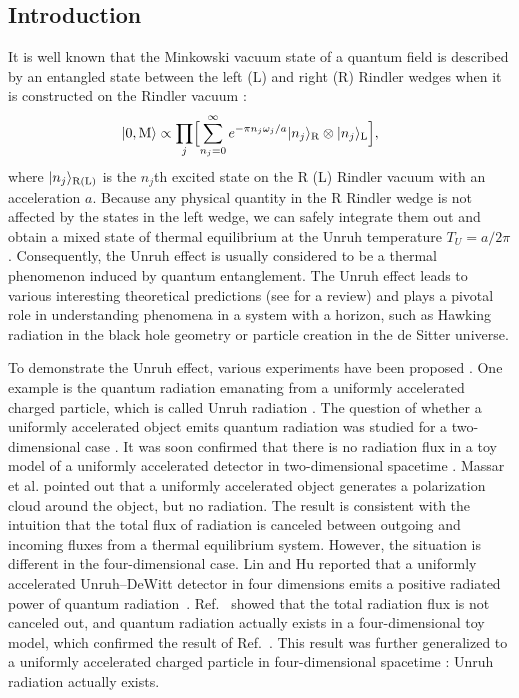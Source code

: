 \documentclass[aps,prd,preprintnumbers,nofootinbib,showpacs]{revtex4}%
\begin{document}
\begin{widetext}
\section{Introduction}
It is well known that the Minkowski vacuum state of a quantum field is described by an entangled state
between the left (L) and right (R) Rindler wedges when it is constructed on the Rindler vacuum \cite{UnruhWald}:
\begin{eqnarray}
\hspace{-5mm}
  |0,{\rm M}\rangle \propto \prod_j\Bigl[
\sum_{n_j=0}^\infty e^{-\pi n_j \omega_j /a } |n_j \rangle_{\rm R} \otimes|n_j\rangle_{\rm L}
\Bigr]  ,
\label{RLentangle}
\end{eqnarray}
where $|n_j \rangle_{\rm R(L)}$ is the $n_j$th excited state on the R (L) Rindler vacuum
with an acceleration $a$.
Because any physical quantity in the R Rindler wedge is not affected by  
the states in the left wedge, we can safely integrate them out and obtain a mixed state of
thermal equilibrium at the Unruh temperature $T_U=a/2\pi$  \cite{Unruh,UnruhWald}.
Consequently, the Unruh effect is usually considered to be a thermal phenomenon induced by 
quantum entanglement. 
The Unruh effect leads to various interesting theoretical predictions (see \cite{Higuchi} for a review) 
and plays a pivotal role in understanding phenomena in a system with a 
horizon, such as Hawking radiation in the black hole geometry or 
particle creation in the de Sitter universe. 

To demonstrate the Unruh effect, various experiments have been proposed 
\cite{Bell1,Bel2,SokolovTernov,SokolovTernov2,BarberMane,Unruh1998,Muller,Vanzella,SuzukiYamada,Vanzella2}.
One example is the quantum radiation emanating from a uniformly accelerated 
charged particle, which is called Unruh radiation 
\cite{ChenTajima,Schutzhold,Schutzhold2,ELI,Cozzella,LH,LH2,IYZ,Lin}.
The question of whether a uniformly accelerated object emits quantum radiation was studied
 for a two-dimensional case \cite{Grove,Raine}. 
It was soon confirmed that there is no radiation flux in a toy model 
of a uniformly accelerated detector in two-dimensional spacetime \cite{HuRaval}.
Massar et al. \cite{Massar} pointed out 
that a uniformly accelerated object generates a polarization cloud around the object,
but no radiation. 
The result is consistent with the intuition that the total flux of radiation is canceled
between outgoing and incoming fluxes from a thermal equilibrium system. 
However, the situation is different in the four-dimensional case. Lin and Hu reported that
a uniformly accelerated Unruh--DeWitt detector in four dimensions emits a 
positive radiated power of quantum radiation~\cite{LH,LH2}. 
Ref.~\cite{IOTYZ} showed that the total radiation flux is not canceled out,
and quantum radiation actually exists in a four-dimensional toy model, which 
confirmed the result of Ref.~\cite{LH,LH2}. 
This result was further generalized to a uniformly accelerated charged particle in 
four-dimensional spacetime \cite{IYZ,OYZ15,OYZ16}: Unruh radiation actually exists.


\end{widetext}
\end{document}
